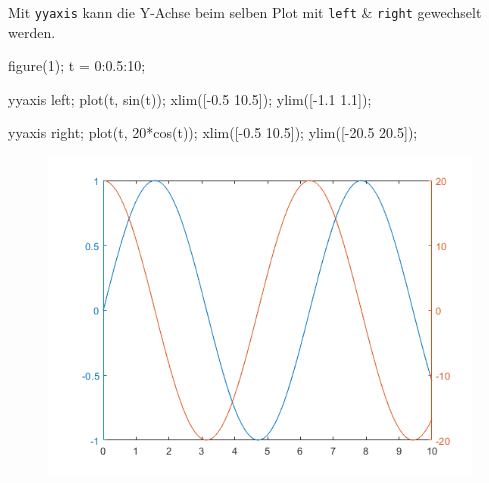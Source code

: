 \documentclass[
  10pt,
  a4paper,
  twocolumn]{article}
\newenvironment{Shaded}{}{}
\newcommand{\FloatTok}[1]{\textcolor[rgb]{0.00,0.36,0.77}{#1}}
\newcommand{\NormalTok}[1]{\textcolor[rgb]{0.14,0.16,0.18}{#1}}
\newcommand{\OperatorTok}[1]{\textcolor[rgb]{0.14,0.16,0.18}{#1}}
\newcommand{\VariableTok}[1]{\textcolor[rgb]{0.89,0.38,0.04}{#1}}
\numberwithin{equation}{section}
\begin{document}
Mit \texttt{yyaxis} kann die Y-Achse beim selben Plot mit \texttt{left}
\& \texttt{right} gewechselt werden.

\begin{Shaded}
\begin{Highlighting}[]
\VariableTok{figure}\NormalTok{(}\FloatTok{1}\NormalTok{)}\OperatorTok{;}
\VariableTok{t} \OperatorTok{=} \FloatTok{0}\OperatorTok{:}\FloatTok{0.5}\OperatorTok{:}\FloatTok{10}\OperatorTok{;}

\VariableTok{yyaxis} \VariableTok{left}\OperatorTok{;}
\VariableTok{plot}\NormalTok{(}\VariableTok{t}\OperatorTok{,} \VariableTok{sin}\NormalTok{(}\VariableTok{t}\NormalTok{))}\OperatorTok{;}
\VariableTok{xlim}\NormalTok{([}\OperatorTok{{-}}\FloatTok{0.5} \FloatTok{10.5}\NormalTok{])}\OperatorTok{;}
\VariableTok{ylim}\NormalTok{([}\OperatorTok{{-}}\FloatTok{1.1} \FloatTok{1.1}\NormalTok{])}\OperatorTok{;}

\VariableTok{yyaxis} \VariableTok{right}\OperatorTok{;}
\VariableTok{plot}\NormalTok{(}\VariableTok{t}\OperatorTok{,} \FloatTok{20}\OperatorTok{*}\VariableTok{cos}\NormalTok{(}\VariableTok{t}\NormalTok{))}\OperatorTok{;}
\VariableTok{xlim}\NormalTok{([}\OperatorTok{{-}}\FloatTok{0.5} \FloatTok{10.5}\NormalTok{])}\OperatorTok{;}
\VariableTok{ylim}\NormalTok{([}\OperatorTok{{-}}\FloatTok{20.5} \FloatTok{20.5}\NormalTok{])}\OperatorTok{;}
\end{Highlighting}
\end{Shaded}

\begin{figure}[H]

{\centering \includegraphics{images/plotyy.png}

}

\end{figure}
\end{document}
